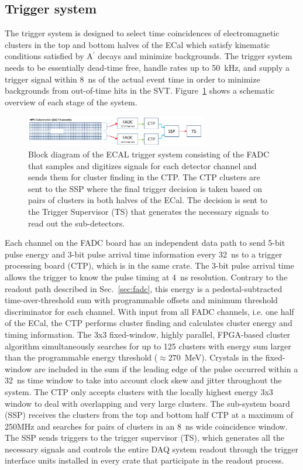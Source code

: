 \documentclass[final,3p,times,twocolumn]{elsarticle}
\newcommand{\Aprime}{A\ensuremath{^\prime}}
\begin{document}
\subsection{Trigger system}
\label{sec:trigger}
The trigger system is designed to select time coincidences of electromagnetic clusters in the top and bottom 
halves of the ECal which satisfy kinematic conditions satisfied by \Aprime{} decays and minimize backgrounds.
The trigger system needs to be essentially dead-time free, handle rates up to 50~kHz, and supply a trigger 
signal within 8~ns of the actual event time in order to minimize backgrounds from out-of-time hits in the SVT. 
Figure~\ref{fig:hps_trigger_cal} shows a schematic overview of each stage of the system. 
 \begin{figure}[b]
\begin{center}
 \includegraphics[width=8cm]{hps_trigger_cal}
\caption{\small Block diagram of the ECAL trigger system consisting of the FADC that samples and digitizes 
signals for each detector channel and sends them for cluster finding in the CTP. The CTP clusters are 
sent to the SSP where the final trigger decision is taken based on pairs of clusters in both halves of the 
ECal. The decision is sent to the Trigger Supervisor (TS) that generates the necessary signals to read out 
the sub-detectors.
 \label{fig:hps_trigger_cal}}
\end{center}
 \end{figure}
Each channel on the FADC board has an independent data path to send 5-bit pulse energy and 3-bit 
pulse arrival time information every 32~ns to a trigger processing board (CTP), which is in the same 
crate. The 3-bit pulse arrival time allows the trigger to know the pulse timing at 4~ns resolution. 
Contrary to the readout path 
described in Sec.~\ref{sec:fadc}, this energy is a pedestal-subtracted time-over-threshold sum with 
programmable offsets and minimum threshold discriminator for each channel. With input from all 
FADC channels, i.e. one half of the ECal, the CTP performs cluster finding and calculates cluster 
energy and timing information. The 3x3 fixed-window, highly parallel, FPGA-based cluster 
algorithm simultaneously searches for up to 125 clusters with energy sum larger than 
the programmable energy threshold ($\approx270$~MeV). Crystals in the 
fixed-window are included in the sum if the leading edge of the pulse occurred within a 32~ns time 
window to take into account clock skew and jitter throughout the system.
The CTP only accepts clusters with the locally highest energy 3x3 window to deal with overlapping and 
very large clusters. The sub-system board (SSP) receives the clusters from the top and bottom half CTP 
at a maximum of 250MHz and searches for pairs of clusters in an 8~ns wide coincidence window. The 
SSP sends triggers to the trigger supervisor (TS), which generates all the necessary signals and 
controls the entire DAQ system readout through the trigger interface units installed in every crate that 
participate in the readout process.
\end{document}
